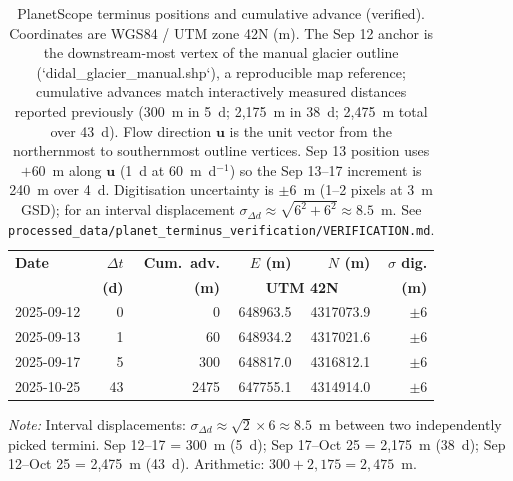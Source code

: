 \begin{table}[ht]
\centering
\caption{PlanetScope terminus positions and cumulative advance (verified). Coordinates are WGS84 / UTM zone 42N (m). The Sep 12 anchor is the downstream-most vertex of the manual glacier outline (`didal\_glacier\_manual.shp`), a reproducible map reference; cumulative advances match interactively measured distances reported previously (300~m in 5~d; 2,175~m in 38~d; 2,475~m total over 43~d). Flow direction $\mathbf{u}$ is the unit vector from the northernmost to southernmost outline vertices. Sep 13 position uses $+60$~m along $\mathbf{u}$ (1~d at 60~m~d$^{-1}$) so the Sep 13--17 increment is 240~m over 4~d. Digitisation uncertainty is $\pm$6~m (1--2 pixels at 3~m GSD); for an interval displacement $\sigma_{\Delta d}\approx\sqrt{6^2+6^2}\approx 8.5$~m. See \texttt{processed\_data/planet\_terminus\_verification/VERIFICATION.md}.}
\label{tab:movement}
\footnotesize
\begin{tabular}{lrrrrr}
\toprule
\textbf{Date} & \textbf{$\Delta t$} & \textbf{Cum.\ adv.} & \textbf{$E$ (m)} & \textbf{$N$ (m)} & \textbf{$\sigma$ dig.} \\
 & \textbf{(d)} & \textbf{(m)} & \multicolumn{2}{c}{\textbf{UTM 42N}} & \textbf{(m)} \\
\midrule
2025-09-12 & 0 & 0 & 648963.5 & 4317073.9 & $\pm$6 \\
2025-09-13 & 1 & 60 & 648934.2 & 4317021.6 & $\pm$6 \\
2025-09-17 & 5 & 300 & 648817.0 & 4316812.1 & $\pm$6 \\
2025-10-25 & 43 & 2475 & 647755.1 & 4314914.0 & $\pm$6 \\
\bottomrule
\end{tabular}
\begin{flushleft}
\footnotesize
\textit{Note:} Interval displacements: $\sigma_{\Delta d}\approx\sqrt{2}\times 6\approx 8.5$~m between two independently picked termini. Sep 12--17 = 300~m (5~d); Sep 17--Oct 25 = 2,175~m (38~d); Sep 12--Oct 25 = 2,475~m (43~d). Arithmetic: $300+2{,}175=2{,}475$~m.
\end{flushleft}
\end{table}
